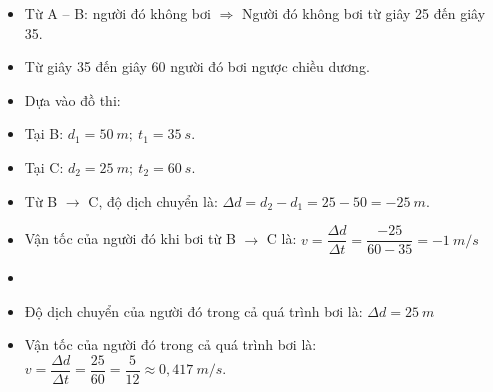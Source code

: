 \begin{vidu}
{\begin{itemize}
\item[2.] Từ A – B: người đó không bơi $\Rightarrow$ Người đó không bơi từ giây 25 đến giây 35.
\item[3.] Từ giây 35 đến giây 60 người đó bơi ngược chiều dương.
\item[4.] Dựa vào đồ thi:
\item[-] Tại B: $d_1=50\ m;\ t_1=35\ s$.
\item[-] Tại C: $d_2=25\ m;\ t_2=60\ s$.
\item[-] Từ B $\to$ C, độ dịch chuyển là: $\Delta d=d_2-d_1=25-50=-25\ m$.
\item[-] Vận tốc của người đó khi bơi từ B $\to$ C là: $v=\dfrac{\Delta d}{\Delta t}=\dfrac{-25}{60-35}=-1\ m/s$
\item[5.] 
\item[-] Độ dịch chuyển của người đó trong cả quá trình bơi là: $\Delta d=25\ m$
\item[-] Vận tốc của người đó trong cả quá trình bơi là: $v=\dfrac{\Delta d}{\Delta t}=\dfrac{25}{60}=\dfrac{5}{12}\approx 0,417\ m/s$.
\end{itemize}
}
\end{vidu}

